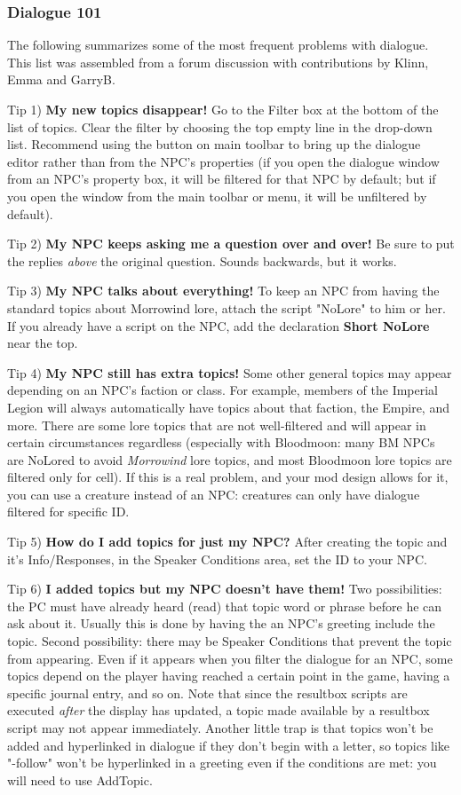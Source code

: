 \hypertarget{dialogue-101}{%
\subsubsection{Dialogue 101}\label{dialogue-101}}

The following summarizes some of the most frequent problems with
dialogue. This list was assembled from a forum discussion with
contributions by Klinn, Emma and GarryB.

Tip 1) \textbf{My new topics disappear!} Go to the Filter box at the
bottom of the list of topics. Clear the filter by choosing the top empty
line in the drop-down list. Recommend using the button on main toolbar
to bring up the dialogue editor rather than from the NPC's properties
(if you open the dialogue window from an NPC's property box, it will be
filtered for that NPC by default; but if you open the window from the
main toolbar or menu, it will be unfiltered by default).

Tip 2) \textbf{My NPC keeps asking me a question over and over!} Be sure
to put the replies \emph{above} the original question. Sounds backwards,
but it works.

Tip 3) \textbf{My NPC talks about everything!} To keep an NPC from
having the standard topics about Morrowind lore, attach the script
"NoLore" to him or her. If you already have a script on the NPC, add the
declaration \textbf{Short NoLore} near the top.

Tip 4) \textbf{My NPC still has extra topics!} Some other general topics
may appear depending on an NPC's faction or class. For example, members
of the Imperial Legion will always automatically have topics about that
faction, the Empire, and more. There are some lore topics that are not
well-filtered and will appear in certain circumstances regardless
(especially with Bloodmoon: many BM NPCs are NoLored to avoid
\emph{Morrowind} lore topics, and most Bloodmoon lore topics are
filtered only for cell). If this is a real problem, and your mod design
allows for it, you can use a creature instead of an NPC: creatures can
only have dialogue filtered for specific ID.

Tip 5) \textbf{How do I add topics for just my NPC?} After creating the
topic and it's Info/Responses, in the Speaker Conditions area, set the
ID to your NPC.

Tip 6) \textbf{I added topics but my NPC doesn't have them!} Two
possibilities: the PC must have already heard (read) that topic word or
phrase before he can ask about it. Usually this is done by having the an
NPC's greeting include the topic. Second possibility: there may be
Speaker Conditions that prevent the topic from appearing. Even if it
appears when you filter the dialogue for an NPC, some topics depend on
the player having reached a certain point in the game, having a specific
journal entry, and so on. Note that since the resultbox scripts are
executed \emph{after} the display has updated, a topic made available by
a resultbox script may not appear immediately. Another little trap is
that topics won't be added and hyperlinked in dialogue if they don't
begin with a letter, so topics like "-follow" won't be hyperlinked in a
greeting even if the conditions are met: you will need to use AddTopic.

